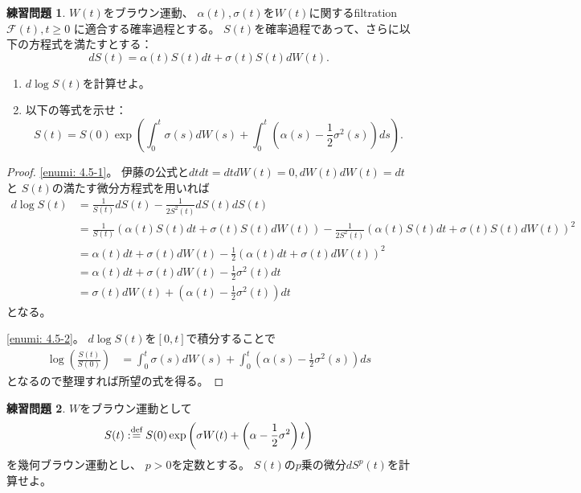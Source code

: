\documentclass[uplatex]{jsarticle}
\theoremstyle{definition}
\newtheorem{prob}[prob]{練習問題}
\def\mcF{\mathcal{F}}
\def\dfn{:\overset{\mbox{{\scriptsize def}}}{=}}
\begin{document}
\begin{prob}\label{prob: 4.5}
  \(W(t)\)をブラウン運動、
  \(\alpha(t),\sigma(t)\)を\(W(t)\)に関するfiltration \(\mcF(t), t\geq 0\)
  に適合する確率過程とする。
  \(S(t)\)を確率過程であって、さらに以下の方程式を満たすとする：
  \[
  dS(t) = \alpha(t)S(t)dt + \sigma(t)S(t)dW(t).
  \]
  \begin{enumerate}
    \item \label{enumi: 4.5-1}
    \(d\log S(t)\)を計算せよ。
    \item \label{enumi: 4.5-2}
    以下の等式を示せ：
    \[
    S(t) = S(0) \exp \left(
    \int_0^t\sigma(s)dW(s)
    + \int_0^t\left( \alpha(s)-\frac{1}{2}\sigma^2(s)\right) ds
    \right).
    \]
  \end{enumerate}
\end{prob}

\begin{proof}
  \ref{enumi: 4.5-1}。
  伊藤の公式と\(dtdt = dtdW(t) = 0, dW(t)dW(t) = dt\)と
  \(S(t)\)の満たす微分方程式を用いれば
  \begin{align*}
    d\log S(t) &= \frac{1}{S(t)}dS(t) - \frac{1}{2S^2(t)}dS(t)dS(t) \\
    &= \frac{1}{S(t)}\left(\alpha(t)S(t)dt + \sigma(t)S(t)dW(t)\right)
    -\frac{1}{2S^2(t)}\left(\alpha(t)S(t)dt + \sigma(t)S(t)dW(t)\right)^2 \\
    &= \alpha(t)dt + \sigma(t)dW(t)
    - \frac{1}{2}\left(\alpha(t)dt + \sigma(t)dW(t)\right)^2 \\
    &= \alpha(t)dt + \sigma(t)dW(t) - \frac{1}{2}\sigma^2(t)dt \\
    &= \sigma(t)dW(t) + \left( \alpha(t) - \frac{1}{2}\sigma^2(t)\right)dt
  \end{align*}
  となる。

  \ref{enumi: 4.5-2}。
  \(d\log S(t)\)を\([0,t]\)で積分することで
  \begin{align*}
    \log \left( \frac{S(t)}{S(0)}\right)
    &= \int_0^t \sigma(s)dW(s) + \int_0^t \left( \alpha(s) - \frac{1}{2}\sigma^2(s)\right)ds
  \end{align*}
  となるので整理すれば所望の式を得る。
\end{proof}



\begin{prob}\label{prob: 4.6}
  \(W\)をブラウン運動として
  \[
  S(t) \dfn S(0)\exp\left(
  \sigma W(t) + \left( \alpha - \frac{1}{2}\sigma^2\right)t\right)
  \]
  を幾何ブラウン運動とし、
  \(p>0\)を定数とする。
  \(S(t)\)の\(p\)乗の微分\(dS^p(t)\)を計算せよ。
\end{prob}
\end{document}
